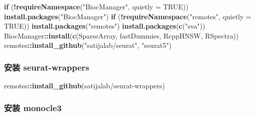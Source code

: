 \documentclass[
]{article}
\newenvironment{Shaded}{\begin{snugshade}}{\end{snugshade}}
\newcommand{\ControlFlowTok}[1]{\textcolor[rgb]{0.13,0.29,0.53}{\textbf{#1}}}
\newcommand{\DataTypeTok}[1]{\textcolor[rgb]{0.13,0.29,0.53}{#1}}
\newcommand{\KeywordTok}[1]{\textcolor[rgb]{0.13,0.29,0.53}{\textbf{#1}}}
\newcommand{\NormalTok}[1]{#1}
\newcommand{\OperatorTok}[1]{\textcolor[rgb]{0.81,0.36,0.00}{\textbf{#1}}}
\newcommand{\OtherTok}[1]{\textcolor[rgb]{0.56,0.35,0.01}{#1}}
\newcommand{\StringTok}[1]{\textcolor[rgb]{0.31,0.60,0.02}{#1}}
\begin{document}
\begin{Shaded}
\begin{Highlighting}[]
\ControlFlowTok{if}\NormalTok{ (}\OperatorTok{!}\KeywordTok{requireNamespace}\NormalTok{(}\StringTok{"BiocManager"}\NormalTok{, }\DataTypeTok{quietly =} \OtherTok{TRUE}\NormalTok{))}
    \KeywordTok{install.packages}\NormalTok{(}\StringTok{"BiocManager"}\NormalTok{)}
\ControlFlowTok{if}\NormalTok{ (}\OperatorTok{!}\KeywordTok{requireNamespace}\NormalTok{(}\StringTok{"remotes"}\NormalTok{, }\DataTypeTok{quietly =} \OtherTok{TRUE}\NormalTok{))}
    \KeywordTok{install.packages}\NormalTok{(}\StringTok{"remotes"}\NormalTok{)}
\KeywordTok{install.packages}\NormalTok{(}\KeywordTok{c}\NormalTok{(}\StringTok{"sva"}\NormalTok{))}
\NormalTok{BiocManager}\OperatorTok{::}\KeywordTok{install}\NormalTok{(}\KeywordTok{c}\NormalTok{(}\StringTok{\textquotesingle{}SparseArray\textquotesingle{}}\NormalTok{, }\StringTok{\textquotesingle{}fastDummies\textquotesingle{}}\NormalTok{, }\StringTok{\textquotesingle{}RcppHNSW\textquotesingle{}}\NormalTok{, }\StringTok{\textquotesingle{}RSpectra\textquotesingle{}}\NormalTok{))}
\NormalTok{remotes}\OperatorTok{::}\KeywordTok{install\_github}\NormalTok{(}\StringTok{"satijalab/seurat"}\NormalTok{, }\StringTok{"seurat5"}\NormalTok{)}
\end{Highlighting}
\end{Shaded}

\hypertarget{ux5b89ux88c5-seurat-wrappers}{%
\subsubsection{安装 seurat-wrappers}\label{ux5b89ux88c5-seurat-wrappers}}

\begin{Shaded}
\begin{Highlighting}[]
\NormalTok{remotes}\OperatorTok{::}\KeywordTok{install\_github}\NormalTok{(}\StringTok{\textquotesingle{}satijalab/seurat{-}wrappers\textquotesingle{}}\NormalTok{)}
\end{Highlighting}
\end{Shaded}

\hypertarget{ux5b89ux88c5-monocle3}{%
\subsubsection{安装 monocle3}\label{ux5b89ux88c5-monocle3}}
\end{document}
